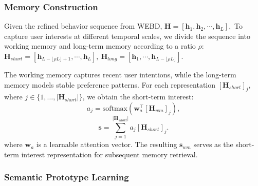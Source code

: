 \documentclass[letterpaper]{article} %
\theoremstyle{definition} %
\begin{document}
\subsubsection{Memory Construction}

Given the refined behavior sequence from WEBD, $\bm{H}=[\bm{h}_1,\bm{h}_2,\cdots,\bm{h}_L],$ To capture user interests at different temporal scales, we divide the sequence into working memory and long-term memory according to a ratio $\rho$: $\bm{H}_{short}=
[\bm{h}_{L-\lfloor\rho L\rfloor+1},\cdots,\bm{h}_{L}],\ 
\bm{H}_{long}=
[\bm{h}_{1},\cdots,\bm{h}_{L-\lfloor\rho L\rfloor}]$. 

The working memory captures recent user intentions, while the long-term memory models stable preference patterns. For each representation $[\bm{H}_{short}]_j$, where $j \in \{1,\ldots,|\bm{H}_{short}|\}$, we obtain the short-term interest: \begin{equation}
a_j=\text{softmax}(\bm{w}_a^\top[\bm{H}_{wm}]_j),
\end{equation}
\begin{equation}
\bm{s}=\sum_{j=1}^{|\bm{H}_{short}|}a_j[\bm{H}_{short}]_j.
\end{equation}
where $\mathbf{w}_a$ is a learnable attention vector. The resulting $\bm{s}_{wm}$ serves as the short-term interest representation for subsequent memory retrieval.

\subsubsection{Semantic Prototype Learning}
\end{document}
